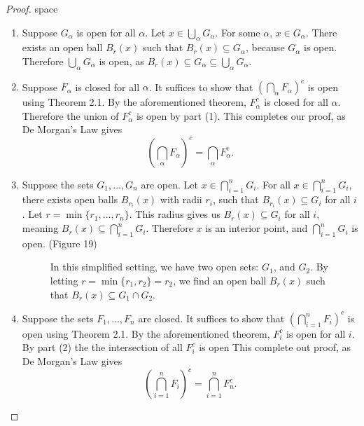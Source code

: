 \documentclass{article}
\theoremstyle{definition}
\begin{document}
	\begin{proof}{\color{white}space}
		\begin{enumerate}
			\item Suppose $ G_\alpha $ is open for all $ \alpha $. Let $ x\in \bigcup_\alpha G_\alpha $. For some $ \alpha $, $ x\in G_\alpha $. There exists an open ball $ B_r(x) $ such that $ B_r(x)\subseteq G_\alpha $, because $ G_\alpha $ is open. Therefore $ \bigcup_\alpha G_\alpha $ is open, as $ B_r(x)\subseteq G_\alpha\subseteq \bigcup_\alpha G_\alpha $. 
			\item Suppose $ F_\alpha $ is closed for all $ \alpha $. It suffices to show that $ (\bigcap_\alpha F_\alpha)^c $ is open using Theorem 2.1. By the aforementioned theorem, $ F_\alpha^c $ is closed for all $ \alpha $. Therefore the union of $ F_\alpha^c $ is open by part (1). This completes our proof, as De Morgan's Law gives $$ \left(\bigcap_\alpha F_\alpha\right)^c=\bigcap_\alpha F_\alpha^c.$$
			\item Suppose the sets $ G_1,\ldots,G_n $ are open. Let $ x\in \bigcap_{i=1}^n G_i$. For all $ x\in\bigcap_{i=1}^n G_i $, there exists open balls $ B_{r_i}(x) $ with radii $ r_i $, such that $ B_{r_i}(x)\subseteq G_i $ for all $ i $. Let $ r=\min\{r_1,\ldots,r_n\} $. This radius gives us $ B_r(x)\subseteq G_i $ for all $ i $, meaning $ B_r(x)\subseteq \bigcap_{i=1}^n G_i $. Therefore $ x $ is an interior point, and $ \bigcap_{i=1}^n G_i $ is open. (Figure 19)   
			\begin{figure}[h!]
				\centering
				\caption{In this simplified setting, we have two open sets: $ G_1 $, and $ G_2 $. By letting $ r=\min\{r_1,r_2\}=r_2 $, we find an open ball $ B_r(x) $ such that $ B_r(x)\subseteq G_1\cap G_2 $. }
			\end{figure}
			\item  Suppose the sets $ F_1,\ldots,F_n $ are closed. It suffices to show that $ (\bigcap_{i=1}^n F_i)^c $ is open using Theorem 2.1. By the aforementioned theorem, $ F_i^c $ is open for all $ i$. By part (2) the the intersection of all $ F_i^c $ is open This complete out proof, as De Morgan's Law gives 
			$$ \left(\bigcap_{i=1}^n F_i\right)^c=\bigcap_{i=1}^n F_n^c.$$
		\end{enumerate}
	\end{proof}
\end{document}
